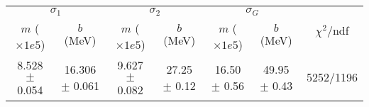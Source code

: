 \begin{tabular}{cc|cc|cc||c}
\multicolumn{2}{c|}{$\sigma_1$} & \multicolumn{2}{|c}{$\sigma_2$} & \multicolumn{2}{|c}{$\sigma_G$}  & \multirow{2}{*}{$\chi^2/$ndf}\\
$m$ ($\times1e5$) & $b$ (MeV) & $m$ ($\times1e5$) & $b$ (MeV) & $m$ ($\times1e5$) & $b$ (MeV) & \\
\hline
8.528 $\pm$ 0.054 & 16.306 $\pm$ 0.061 & 9.627 $\pm$ 0.082 & 27.25 $\pm$ 0.12 & 16.50 $\pm$ 0.56 & 49.95 $\pm$ 0.43 & 5252/1196\\
\end{tabular}
